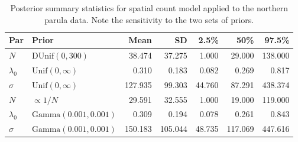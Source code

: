 \begin{table}%
  \centering
  \caption{Posterior summary statistics for spatial count
    model applied to the northern parula data. Note the sensitivity to
    the two sets of priors. }
  \begin{tabular}{llrrrrr}
    \hline
    Par         & Prior                       & Mean    & SD      & 2.5\%  & 50\%    & 97.5\%  \\
    \hline
    $N$         & $\text{DUnif}(0,300)$       & 38.474  & 37.275  & 1.000  & 29.000  & 138.000 \\
    $\lambda_0$ & $\text{Unif}(0,\infty)$     & 0.310   & 0.183   & 0.082  & 0.269   & 0.817   \\
    $\sigma$    & $\text{Unif}(0,\infty)$     & 127.935 & 99.303  & 44.760 & 87.291  & 438.374 \\
    \hline
    $N$         & $\propto 1/N$               & 29.591  & 32.555  & 1.000  & 19.000  & 119.000 \\
    $\lambda_0$ & $\text{Gamma}(0.001,0.001)$ & 0.309   & 0.194   & 0.078  & 0.261   & 0.843   \\
    $\sigma$    & $\text{Gamma}(0.001,0.001)$ & 150.183 & 105.044 & 48.735 & 117.069 & 447.616 \\
    \hline
  \end{tabular}
  \label{unmarked.tab.nopa}
\end{table}




